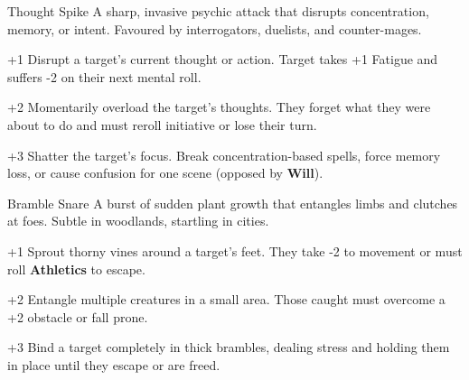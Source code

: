 \begin{WyrdSpell}[Mentalism]{Thought Spike}
    A sharp, invasive psychic attack that disrupts concentration, memory, or intent. Favoured by interrogators, duelists, and counter-mages.

    \begin{WyrdSpellBlock}
        \item[+1] Disrupt a target’s current thought or action. Target takes +1 Fatigue and suffers -2 on their next mental roll.
        \item[+2] Momentarily overload the target’s thoughts. They forget what they were about to do and must reroll initiative or lose their turn.
        \item[+3] Shatter the target’s focus. Break concentration-based spells, force memory loss, or cause confusion for one scene (opposed by \textbf{Will}).
    \end{WyrdSpellBlock}
\end{WyrdSpell}

\begin{WyrdSpell}[Verdancy]{Bramble Snare}
    A burst of sudden plant growth that entangles limbs and clutches at foes. Subtle in woodlands, startling in cities.

    \begin{WyrdSpellBlock}
        \item[+1] Sprout thorny vines around a target’s feet. They take -2 to movement or must roll \textbf{Athletics} to escape.
        \item[+2] Entangle multiple creatures in a small area. Those caught must overcome a +2 obstacle or fall prone.
        \item[+3] Bind a target completely in thick brambles, dealing stress and holding them in place until they escape or are freed.
    \end{WyrdSpellBlock}
\end{WyrdSpell}

